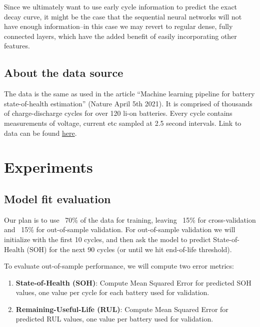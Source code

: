 \documentclass{article}
\begin{document}
Since we ultimately want to use early cycle information to predict the exact decay curve, it might be the case that the sequential neural networks will not have enough information--in this case we may revert to regular dense, fully connected layers, which have the added benefit of easily incorporating other features.  

\subsection{About the data source}
The data is the same as used in the article “Machine learning pipeline for battery state-of-health estimation” (Nature April 5th 2021). It is comprised of thousands of charge-discharge cycles for over 120 li-on batteries. Every cycle contains measurements of voltage, current etc sampled at 2.5 second intervals. Link to data can be found \href{https://data.matr.io/1/projects/5c48dd2bc625d700019f3204}{here}.

\section{Experiments}
\subsection{Model fit evaluation}

Our plan is to use ~70\% of the data for training, leaving ~15\% for cross-validation and ~15\% for out-of-sample validation. For out-of-sample validation we will initialize with the first 10 cycles, and then ask the model to predict State-of-Health (SOH) for the next 90 cycles (or until we hit end-of-life threshold).

To evaluate out-of-sample performance, we will compute two error metrics:
\begin{enumerate}
    \item \textbf{State-of-Health (SOH)}: Compute Mean Squared Error for predicted SOH values, one value per cycle for each battery used for validation. 
    \item \textbf{Remaining-Useful-Life (RUL)}: Compute Mean Squared Error for predicted RUL values, one value per battery used for validation.
\end{enumerate}
\end{document}
